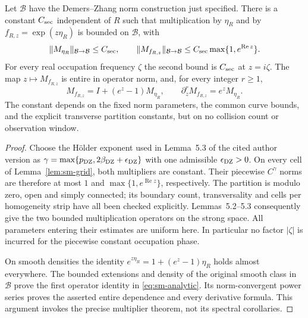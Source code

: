 \begin{theorem}
\label{thm:sm-multipliers}
Let $\mathcal B$ have the Demers--Zhang norm construction just
specified. There is a constant $C_{\rm sec}$ independent of $R$
such that multiplication by $\eta_R$ and by
$f_{R,z}=\exp(z\eta_R)$ is bounded on $\mathcal B$, with
\begin{equation}\label{eq:sm-strong}
 \|M_{\eta_R}\|_{\mathcal B\to\mathcal B}\le C_{\rm sec},
 \qquad
 \|M_{f_{R,z}}\|_{\mathcal B\to\mathcal B}
       \le C_{\rm sec}\max\{1,e^{\operatorname{Re}z}\}.
\end{equation}
For every real occupation frequency $\zeta$ the second bound is
$C_{\rm sec}$ at $z=i\zeta$. The map $z\mapsto M_{f_{R,z}}$
is entire in operator norm, and, for every integer $r\ge1$,
\begin{equation}\label{eq:sm-analytic}
 M_{f_{R,z}}=I+(e^z-1)M_{\eta_R},\qquad
 \partial_z^r M_{f_{R,z}}=e^zM_{\eta_R}.
\end{equation}
The constant depends on the fixed norm parameters, the common
curve bounds, and the explicit transverse partition constants,
but on no collision count or observation window.
\end{theorem}
\begin{proof}
Choose the H\"older exponent used in Lemma~5.3 of the cited
author version as
$\gamma=\max\{p_{\rm DZ},2\beta_{\rm DZ}+\epsilon_{\rm DZ}\}$
with one admissible $\epsilon_{\rm DZ}>0$. On every cell of
Lemma~\ref{lem:sm-grid}, both multipliers are constant. Their
piecewise $C^\gamma$ norms are therefore at most $1$ and
$\max\{1,e^{\operatorname{Re}z}\}$, respectively.
The partition is modulo zero, open and simply connected; its
boundary count, transversality and cells per homogeneity strip
have all been checked explicitly. Lemmas~5.2--5.3 consequently
give the two bounded multiplication operators on the strong space.
All parameters entering their estimates are uniform here. In
particular no factor $|\zeta|$ is incurred for the piecewise constant
occupation phase.

On smooth densities the identity
$e^{z\eta_R}=1+(e^z-1)\eta_R$ holds almost everywhere. The bounded
extensions and density of the original smooth class in
$\mathcal B$ prove the first operator identity in
\eqref{eq:sm-analytic}. Its norm-convergent power series proves
the asserted entire dependence and every derivative formula.
This argument invokes the precise multiplier theorem, not its
spectral corollaries.
\end{proof}

